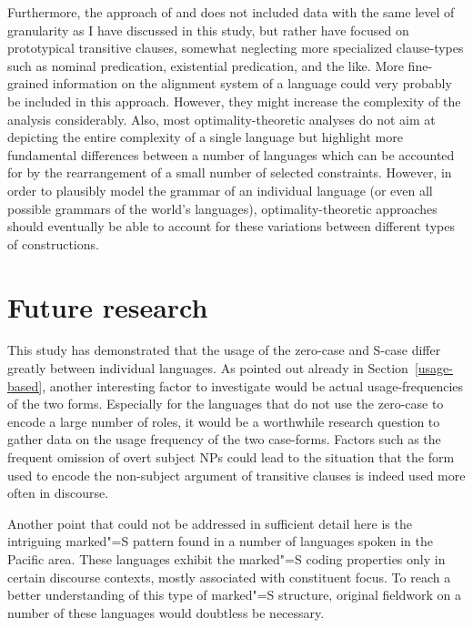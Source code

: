 Furthermore, the approach of \citet{deHoop:2008} and \citet{Malchukov:2011} does not included data with the same level of granularity as I have discussed in this study, but rather have focused on prototypical transitive clauses, somewhat neglecting more specialized clause-types such as nominal predication, existential predication, and the like. 
More fine-grained information on the alignment system of a language could very probably be included in this approach. 
However, they might increase the complexity of the analysis considerably. 
Also, most optimality-theoretic analyses do not aim at depicting the entire complexity of a single language but highlight more fundamental differences between a number of languages which can be accounted for by the rearrangement of a small number of selected constraints. 
However, in order to plausibly model the grammar of an individual language (or even all possible grammars of the world's languages), optimality-theoretic approaches should eventually be able to account for these variations between different types of constructions.
 
\section{Future research}\label{furtherresearch}

This study has demonstrated that the usage of the zero-case and S-case differ greatly between individual languages. 
As pointed out already in Section~\ref{usage-based}, another interesting factor to investigate would be actual usage-fre\-quen\-cies of the two forms. 
Especially for the languages that do not use the zero-case to encode a large number of roles, it would be a worthwhile research question to gather data on the usage frequency of the two case-forms. 
Factors such as the frequent omission of overt subject NPs could lead to the situation that the form used to encode the non-subject argument of transitive clauses is indeed used more often in discourse.   

Another point that could not be addressed in sufficient detail here is the intriguing marked"=S pattern found in a number of languages spoken in the Pacific area. 
These languages exhibit the marked"=S coding properties only in certain discourse contexts, mostly associated with constituent focus. 
To reach a better understanding of this type of marked"=S structure, original fieldwork on a number of these languages would doubtless be necessary. 

